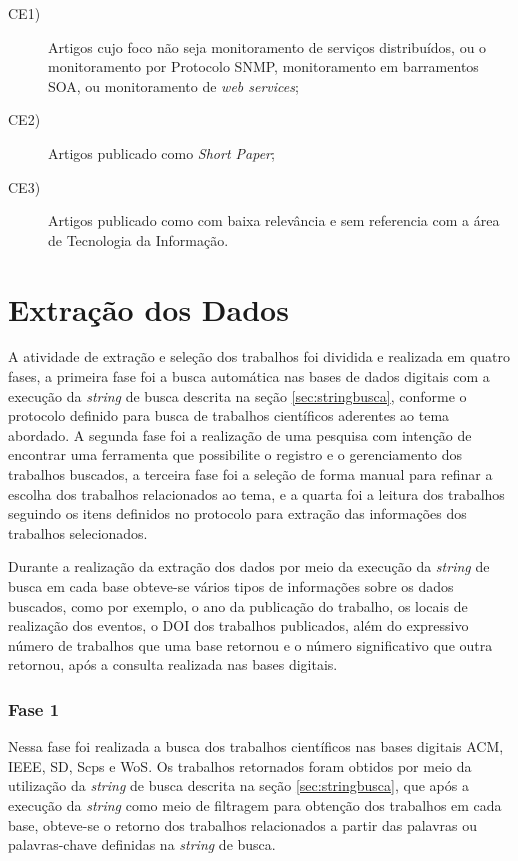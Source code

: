 \begin{description}
\item[CE1)]Artigos cujo foco não seja monitoramento de serviços distribuídos, ou o monitoramento por Protocolo \acrshort{SNMP}, monitoramento em barramentos \acrshort{SOA}, ou monitoramento de \textit{web services};
\item[CE2)] Artigos publicado como \textit{Short Paper};
\item[CE3)] Artigos publicado como com baixa relevância e sem referencia com a área de Tecnologia da Informação.
\end{description}


\section{Extração dos Dados}
A atividade de extração e seleção dos trabalhos foi dividida e realizada em quatro fases, a primeira fase foi a busca automática nas bases de dados digitais com a execução da \textit{string} de busca descrita na seção \ref{sec:stringbusca}, conforme o protocolo definido para busca de trabalhos científicos aderentes ao tema abordado. A segunda fase foi a realização de uma pesquisa com intenção de encontrar uma ferramenta que possibilite o registro e o gerenciamento dos trabalhos buscados, a terceira fase foi a seleção de forma manual para refinar a escolha dos trabalhos relacionados ao tema, e a quarta foi a leitura dos trabalhos seguindo os itens definidos no protocolo para extração das informações dos trabalhos selecionados. 

Durante a realização da extração dos dados por meio da execução da \textit{string} de busca em cada base obteve-se vários tipos de informações sobre os dados buscados, como por exemplo, o ano da publicação do trabalho, os locais de realização dos eventos, o \acrshort{DOI} dos trabalhos publicados, além do  expressivo número de trabalhos que uma base retornou e o número significativo que outra retornou, após a consulta realizada nas bases digitais.

\subsubsection{Fase 1}
Nessa fase foi realizada a busca dos trabalhos científicos nas bases digitais \acrlong{ACM}, \acrlong{IEEE}, \acrlong{SD}, \acrlong{Scps} e \acrlong{WoS}. Os trabalhos retornados foram obtidos por meio da utilização da \textit{string} de busca descrita na seção \ref{sec:stringbusca}, que após a execução da \textit{string} como meio de filtragem para obtenção dos trabalhos em cada base, obteve-se o retorno dos trabalhos relacionados a partir das palavras ou palavras-chave definidas na \textit{string} de busca. 

